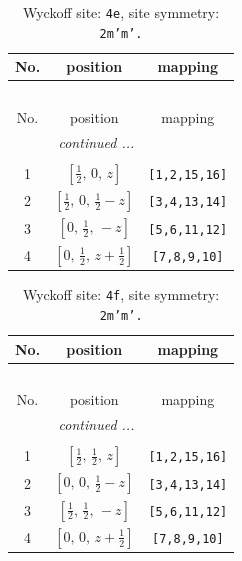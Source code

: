 \documentclass[fleqn,8pt]{jsarticle}
\begin{document}
\begin{longtable}{ccc}
\caption{Wyckoff site: {\tt 4e}, site symmetry: {\tt 2m'm'.}}
 \\
 \hline \hline
No. & position & mapping \\ \hline \endfirsthead

\multicolumn{2}{l}{\tablename\ \thetable{}} \\
 \hline \hline
No. & position & mapping \\ \hline \endhead

 \hline \hline
\multicolumn{2}{r}{\footnotesize\it continued ...} \\ \endfoot

 \hline \hline
\multicolumn{2}{r}{} \\ \endlastfoot

1 & $\left[ \frac{1}{2},\, 0,\, z \right]$ & {\tt [1,2,15,16]} \\ \hline
2 & $\left[ \frac{1}{2},\, 0,\, \frac{1}{2} - z \right]$ & {\tt [3,4,13,14]} \\ \hline
3 & $\left[ 0,\, \frac{1}{2},\, - z \right]$ & {\tt [5,6,11,12]} \\ \hline
4 & $\left[ 0,\, \frac{1}{2},\, z + \frac{1}{2} \right]$ & {\tt [7,8,9,10]} \\
\end{longtable}
\renewcommand{\arraystretch}{1.2}
\begin{longtable}{ccc}
\caption{Wyckoff site: {\tt 4f}, site symmetry: {\tt 2m'm'.}}
 \\
 \hline \hline
No. & position & mapping \\ \hline \endfirsthead

\multicolumn{2}{l}{\tablename\ \thetable{}} \\
 \hline \hline
No. & position & mapping \\ \hline \endhead

 \hline \hline
\multicolumn{2}{r}{\footnotesize\it continued ...} \\ \endfoot

 \hline \hline
\multicolumn{2}{r}{} \\ \endlastfoot

1 & $\left[ \frac{1}{2},\, \frac{1}{2},\, z \right]$ & {\tt [1,2,15,16]} \\ \hline
2 & $\left[ 0,\, 0,\, \frac{1}{2} - z \right]$ & {\tt [3,4,13,14]} \\ \hline
3 & $\left[ \frac{1}{2},\, \frac{1}{2},\, - z \right]$ & {\tt [5,6,11,12]} \\ \hline
4 & $\left[ 0,\, 0,\, z + \frac{1}{2} \right]$ & {\tt [7,8,9,10]} \\
\end{longtable}
\end{document}
